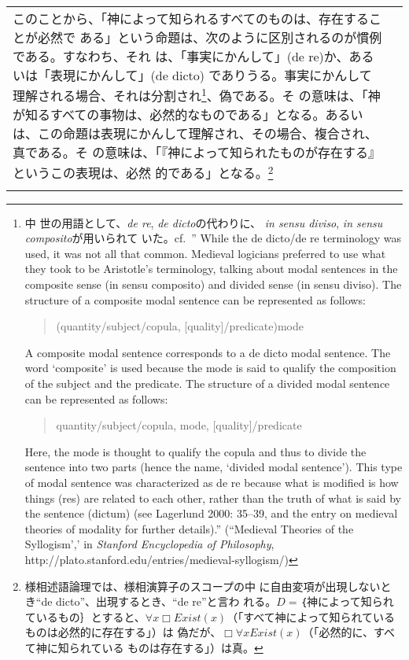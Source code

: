 \documentclass[10pt]{jsarticle} %
\begin{document}
\begin{longtable}{p{21em}p{21em}}
このことから、「神によって知られるすべてのものは、存在することが必然で
ある」という命題は、次のように区別されるのが慣例である。すなわち、それ
は、「事実にかんして」(de re)か、あるいは「表現にかんして」(de dicto)
でありうる。事実にかんして理解される場合、それは分割され\footnote {中
世の用語として、{\itshape de re}, {\itshape de dicto}の代わりに、
{\itshape in sensu diviso}, {\itshape in sensu composito}が用いられて
いた。cf.~'' While the de dicto/de re terminology was used, it was not
all that common. Medieval logicians preferred to use what they took to
be Aristotle's terminology, talking about modal sentences in the
composite sense (in sensu composito) and divided sense (in sensu
diviso). The structure of a composite modal sentence can be
represented as follows:
\begin{quote}
   (quantity/subject/copula, [quality]/predicate)mode
\end{quote}
A composite modal sentence corresponds to a de dicto modal
sentence. The word ‘composite’ is used because the mode is said to
qualify the composition of the subject and the predicate. The
structure of a divided modal sentence can be represented as follows:
\begin{quote}
quantity/subject/copula, mode, [quality]/predicate
\end{quote}
Here, the mode is thought to qualify the copula and thus to divide the
sentence into two parts (hence the name, ‘divided modal
sentence’). This type of modal sentence was characterized as de re
because what is modified is how things (res) are related to each
other, rather than the truth of what is said by the sentence (dictum)
(see Lagerlund 2000: 35–39, and the entry on medieval theories of
modality for further details).'' (``Medieval Theories of the
Syllogism',' in {\itshape Stanford Encyclopedia of Philosophy},
http://plato.stanford.edu/entries/medieval-syllogism/) }、偽である。そ
の意味は、「神が知るすべての事物は、必然的なものである」となる。あるい
は、この命題は表現にかんして理解され、その場合、複合され、真である。そ
の意味は、「『神によって知られたものが存在する』というこの表現は、必然
的である」となる。\footnote{様相述語論理では、様相演算子のスコープの中
に自由変項が出現しないとき``de dicto''、出現するとき、``de re''と言わ
れる。$D = $｛神によって知られているもの｝とすると、$\forall x \Box
Exist(x)$（「すべて神によって知られているものは必然的に存在する」）は
偽だが、$\Box \forall x Exist(x)$（「必然的に、すべて神に知られている
ものは存在する」）は真。}


\\\\


\end{longtable}
\end{document}
